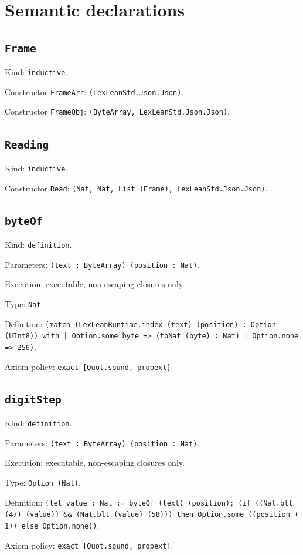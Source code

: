 \documentclass[11pt]{article}
\begin{document}
\section*{Semantic declarations}
\subsection*{\texttt{Frame}}
\noindent Kind: \texttt{inductive}.\par
\noindent Constructor \texttt{FrameArr}: \texttt{(LexLeanStd.Json.Json)}.\par
\noindent Constructor \texttt{FrameObj}: \texttt{(ByteArray, LexLeanStd.Json.Json)}.\par
\subsection*{\texttt{Reading}}
\noindent Kind: \texttt{inductive}.\par
\noindent Constructor \texttt{Read}: \texttt{(Nat, Nat, List (Frame), LexLeanStd.Json.Json)}.\par
\subsection*{\texttt{byteOf}}
\noindent Kind: \texttt{definition}.\par
\noindent Parameters: \texttt{(text : ByteArray) (position : Nat)}.\par
\noindent Execution: executable, non-escaping closures only.\par
\noindent Type: \texttt{Nat}.\par
\noindent Definition: \texttt{(match (LexLeanRuntime.index (text) (position) : Option (UInt8)) with | Option.some byte => (toNat (byte) : Nat) | Option.none => 256)}.\par
\noindent Axiom policy: \texttt{exact [Quot.sound, propext]}.\par
\subsection*{\texttt{digitStep}}
\noindent Kind: \texttt{definition}.\par
\noindent Parameters: \texttt{(text : ByteArray) (position : Nat)}.\par
\noindent Execution: executable, non-escaping closures only.\par
\noindent Type: \texttt{Option (Nat)}.\par
\noindent Definition: \texttt{(let value : Nat := byteOf (text) (position); (if ((Nat.blt (47) (value)) \&\& (Nat.blt (value) (58))) then Option.some ((position + 1)) else Option.none))}.\par
\noindent Axiom policy: \texttt{exact [Quot.sound, propext]}.\par
\end{document}
